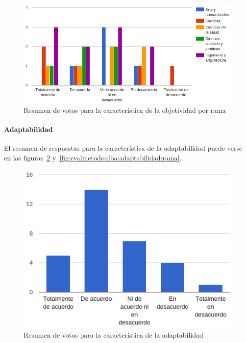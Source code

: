 \begin{figure}[h]
  \begin{center}
    \includegraphics[scale=0.5]{C_DBA_objetividad_rama.png}
  \end{center}
  \caption{Resumen de votos para la característica de la objetividad por rama}
  \label{fig:evalmetodo:dba:objetividad:rama}
\end{figure}

\newpage
\paragraph*{Adaptabilidad}

El resumen de respuestas para la característica de la adaptabilidad puede verse en las figuras~\ref{fig:evalmetodo:dba:adaptabilidad} y~\ref{fig:evalmetodo:dba:adaptabilidad:rama}.

\begin{figure}[h]
  \begin{center}
    \includegraphics[scale=0.5]{C_DBA_adaptabilidad.png}
  \end{center}
  \caption{Resumen de votos para la característica de la adaptabilidad}
  \label{fig:evalmetodo:dba:adaptabilidad}
\end{figure}

